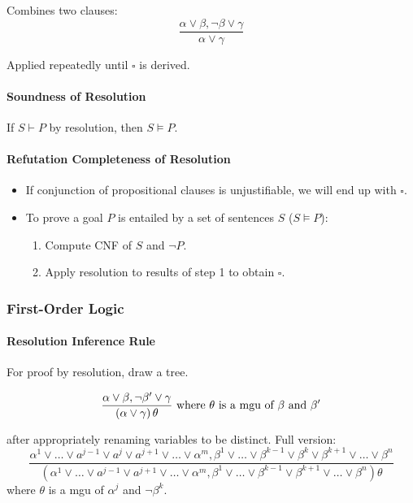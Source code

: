 \documentclass[twocolumn,english]{article}
\begin{document}
Combines two clauses: 
\[
\dfrac{\alpha\lor\beta,\lnot\beta\lor\gamma}{\alpha\lor\gamma}
\]

Applied repeatedly until $\square$ is derived.

\paragraph{Soundness of Resolution}

If $S\vdash P$ by resolution, then $S\vDash P$.

\paragraph{Refutation Completeness of Resolution}
\begin{itemize}
\item If conjunction of propositional clauses is unjustifiable, we will
end up with $\square$. 
\item To prove a goal $P$ is entailed by a set of sentences $S$ ($S\vDash P$): 
\begin{enumerate}
\item Compute CNF of $S$ and $\lnot P$. 
\item Apply resolution to results of step 1 to obtain $\square$. 
\end{enumerate}
\end{itemize}

\subsubsection{First-Order Logic}

\paragraph{Resolution Inference Rule}

For proof by resolution, draw a tree.

\[
\dfrac{\alpha\lor\beta,\lnot\beta'\lor\gamma}{\left(\alpha\lor\gamma\right)\theta}\text{ where \ensuremath{\theta} is a mgu of \ensuremath{\beta} and \ensuremath{\beta'}}
\]

after appropriately renaming variables to be distinct. Full version:
\[
\dfrac{\alpha^{1}\lor\dots\lor a^{j-1}\lor a^{j}\lor a^{j+1}\lor\dots\lor\alpha^{m},\beta^{1}\lor\dots\lor\beta^{k-1}\lor\beta^{k}\lor\beta^{k+1}\lor\dots\lor\beta^{n}}{\left(\alpha^{1}\lor\dots\lor a^{j-1}\lor a^{j+1}\lor\dots\lor\alpha^{m},\beta^{1}\lor\dots\lor\beta^{k-1}\lor\beta^{k+1}\lor\dots\lor\beta^{n}\right)\theta}
\]
where $\theta$ is a mgu of $\alpha^{j}$ and $\lnot\beta^{k}$.
\end{document}

